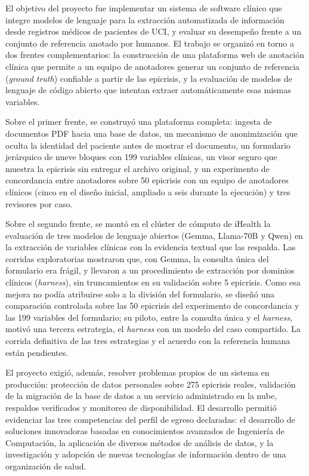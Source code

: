 \documentclass[12pt,letterpaper]{article}
\begin{document}
El objetivo del proyecto fue implementar un sistema de software clínico que integre modelos de lenguaje para la extracción automatizada de información desde registros médicos de pacientes de UCI, y evaluar su desempeño frente a un conjunto de referencia anotado por humanos. El trabajo se organizó en torno a dos frentes complementarios: la construcción de una plataforma web de anotación clínica que permite a un equipo de anotadores generar un conjunto de referencia (\textit{ground truth}) confiable a partir de las epicrisis, y la evaluación de modelos de lenguaje de código abierto que intentan extraer automáticamente esas mismas variables.

Sobre el primer frente, se construyó una plataforma completa: ingesta de documentos PDF hacia una base de datos, un mecanismo de anonimización que oculta la identidad del paciente antes de mostrar el documento, un formulario jerárquico de nueve bloques con 199 variables clínicas, un visor seguro que muestra la epicrisis sin entregar el archivo original, y un experimento de concordancia entre anotadores sobre 50 epicrisis con un equipo de anotadores clínicos (cinco en el diseño inicial, ampliado a seis durante la ejecución) y tres revisores por caso.

Sobre el segundo frente, se montó en el clúster de cómputo de iHealth la evaluación de tres modelos de lenguaje abiertos (Gemma, Llama-70B y Qwen) en la extracción de variables clínicas con la evidencia textual que las respalda. Las corridas exploratorias mostraron que, con Gemma, la consulta única del formulario era frágil, y llevaron a un procedimiento de extracción por dominios clínicos (\textit{harness}), sin truncamientos en su validación sobre 5 epicrisis. Como esa mejora no podía atribuirse solo a la división del formulario, se diseñó una comparación controlada sobre las 50 epicrisis del experimento de concordancia y las 199 variables del formulario; su piloto, entre la consulta única y el \textit{harness}, motivó una tercera estrategia, el \textit{harness} con un modelo del caso compartido. La corrida definitiva de las tres estrategias y el acuerdo con la referencia humana están pendientes.

El proyecto exigió, además, resolver problemas propios de un sistema en producción: protección de datos personales sobre 275 epicrisis reales, validación de la migración de la base de datos a un servicio administrado en la nube, respaldos verificados y monitoreo de disponibilidad. El desarrollo permitió evidenciar las tres competencias del perfil de egreso declaradas: el desarrollo de soluciones innovadoras basadas en conocimientos avanzados de Ingeniería de Computación, la aplicación de diversos métodos de análisis de datos, y la investigación y adopción de nuevas tecnologías de información dentro de una organización de salud.
\newpage
\end{document}
